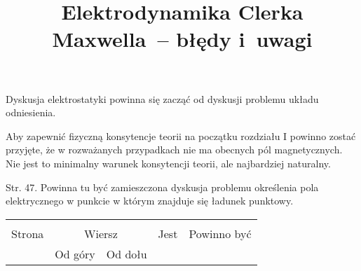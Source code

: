 \documentclass[a4paper,11pt]{article}
\title{Elektrodynamika Clerka Maxwella~-- błędy i~uwagi}
\begin{document}





\maketitle %









Dyskusja elektrostatyki powinna się zacząć od dyskusji problemu układu odniesienia.

\vspace{\spaceFour}



Aby zapewnić fizyczną konsytencje teorii na początku rozdziału I powinno zostać przyjęte, że w rozważanych przypadkach nie ma obecnych pól magnetycznych. Nie jest to minimalny warunek konsytencji teorii, ale najbardziej naturalny.

\vspace{\spaceFour}








Str. 47. Powinna tu być zamieszczona dyskusja problemu określenia pola elektrycznego w punkcie w którym znajduje się ładunek punktowy.





\begin{center}

  \begin{tabular}{|c|c|c|c|c|}
    \hline
    & \multicolumn{2}{c|}{} & & \\
    Strona & \multicolumn{2}{c|}{Wiersz} & Jest
                              & Powinno być \\ \cline{2-3}
    & Od góry & Od dołu & & \\
    \hline
    \hline
  \end{tabular}

\end{center}
\end{document}
